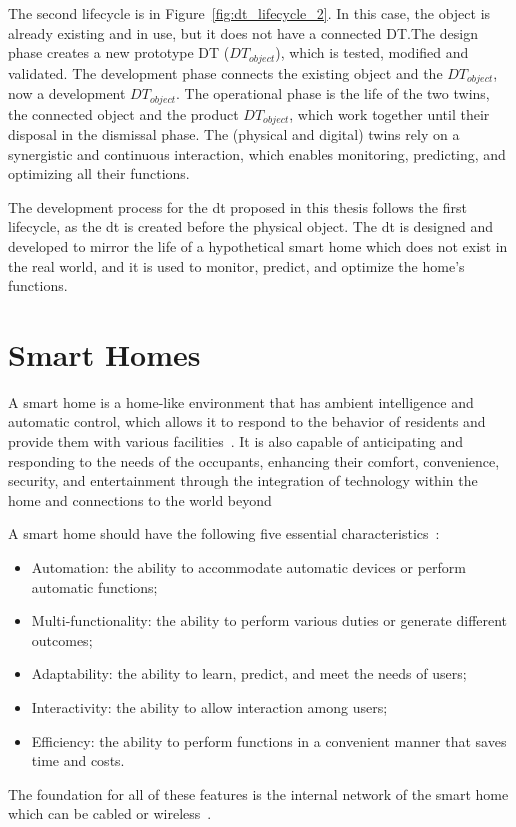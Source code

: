 The second lifecycle is in Figure~\ref{fig:dt_lifecycle_2}. In this case, the object is already existing and in use, but it does not have a connected DT.\@ The design phase creates a new prototype DT (\(DT_{object}\)), which is tested, modified and validated. The development phase connects the existing object and the \(DT_{object}\), now a development \(DT_{object}\). The operational phase is the life of the two twins, the connected object and the product \(DT_{object}\), which work together until their disposal in the dismissal phase. The (physical and digital) twins rely on a synergistic and continuous interaction, which enables monitoring, predicting, and optimizing all their functions.

The development process for the \acrshort{dt} proposed in this thesis follows the first lifecycle, as the \acrshort{dt} is created before the physical object. The \acrshort{dt} is designed and developed to mirror the life of a hypothetical smart home which does not exist in the real world, and it is used to monitor, predict, and optimize the home's functions.

\section{Smart Homes}

A smart home is a home-like environment that has ambient intelligence and automatic control, which allows it to respond to the behavior of residents and provide them with various facilities~\parencite{desilvaStateArtSmart2012}. It is also capable of anticipating and responding to the needs of the occupants, enhancing their comfort, convenience, security, and entertainment through the integration of technology within the home and connections to the world beyond~\parencite{aldrichSmartHomesPresent2003}

A smart home should have the following five essential characteristics~\parencite{leSmartHomesOlder2012}:
\begin{itemize}
    \item Automation: the ability to accommodate automatic devices or perform automatic functions;
    \item Multi-functionality: the ability to perform various duties or generate different outcomes;
    \item Adaptability: the ability to learn, predict, and meet the needs of users;
    \item Interactivity: the ability to allow interaction among users;
    \item Efficiency: the ability to perform functions in a convenient manner that saves time and costs.
\end{itemize}
The foundation for all of these features is the internal network of the smart home which can be cabled or wireless~\parencite{jiangSmartHomeResearch2004}.

